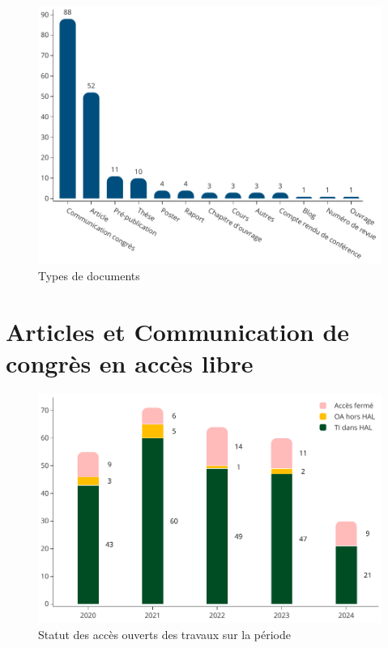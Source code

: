 \documentclass[french, 11pt]{assets/biso}
\begin{document}
\begin{figure}[!h]
  \includegraphics[width=\textwidth]{figures/document_types.pdf}
  \centering
  \caption{Types de documents}
  \label{fig_doc_type}
\end{figure}


\pagebreak

\section{Articles et Communication de congrès en accès libre} %

\begin{figure}[!h]
  \includegraphics[width=\textwidth]{figures/open_access_works.pdf}
  \caption{Statut des accès ouverts des travaux sur la période \oaworksperiod}
  \label{fig_open_access_works}
\end{figure}
\end{document}

